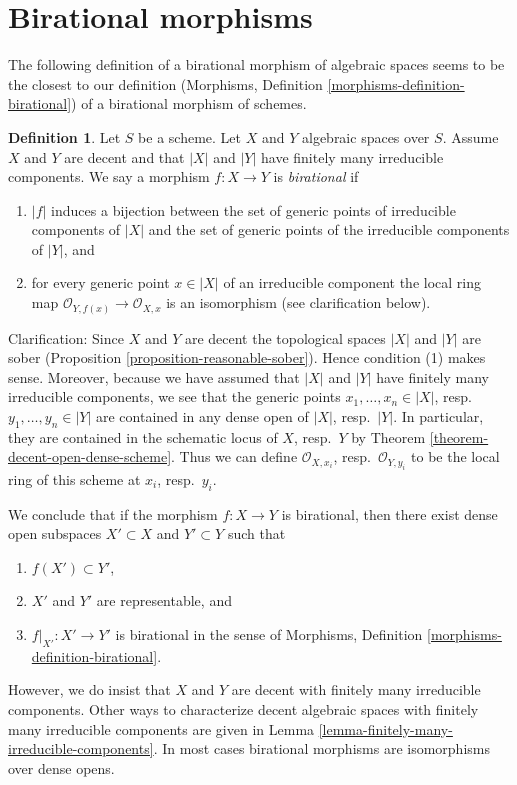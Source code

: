 \documentclass{stacks-project}
\theoremstyle{plain}
\theoremstyle{definition}
\newtheorem{definition}[subsection]{Definition}
\theoremstyle{remark}
\numberwithin{equation}{subsection}
\begin{document}
\section{Birational morphisms}
\label{section-birational}

\noindent
The following definition of a birational morphism of algebraic spaces
seems to be the closest to our definition
(Morphisms, Definition \ref{morphisms-definition-birational})
of a birational morphism of schemes.

\begin{definition}
\label{definition-birational}
Let $S$ be a scheme. Let $X$ and $Y$ algebraic spaces over $S$.
Assume $X$ and $Y$ are decent and that $|X|$ and $|Y|$ have finitely many
irreducible components. We say a morphism $f : X \to Y$ is
{\it birational} if
\begin{enumerate}
\item $|f|$ induces a bijection between the set of generic points
of irreducible components of $|X|$ and the set of generic points
of the irreducible components of $|Y|$, and
\item for every generic point $x \in |X|$ of an irreducible component
the local ring map $\mathcal{O}_{Y, f(x)} \to \mathcal{O}_{X, x}$
is an isomorphism (see clarification below).
\end{enumerate}
\end{definition}

\noindent
Clarification: Since $X$ and $Y$ are decent the topological spaces
$|X|$ and $|Y|$ are sober (Proposition \ref{proposition-reasonable-sober}).
Hence condition (1) makes sense. Moreover, because we have assumed
that $|X|$ and $|Y|$ have finitely many irreducible components, we
see that the generic points $x_1, \ldots, x_n \in |X|$,
resp.\ $y_1, \ldots, y_n \in |Y|$ are contained in any dense open
of $|X|$, resp.\ $|Y|$. In particular, they are contained in
the schematic locus of $X$, resp.\ $Y$ by
Theorem \ref{theorem-decent-open-dense-scheme}.
Thus we can define $\mathcal{O}_{X, x_i}$, resp.\ $\mathcal{O}_{Y, y_i}$
to be the local ring of this scheme at $x_i$, resp.\ $y_i$.

\medskip\noindent
We conclude that if the morphism $f : X \to Y$ is birational, then
there exist dense open subspaces $X' \subset X$ and $Y' \subset Y$ such that
\begin{enumerate}
\item $f(X') \subset Y'$,
\item $X'$ and $Y'$ are representable, and
\item $f|_{X'} : X' \to Y'$ is birational in
the sense of Morphisms, Definition \ref{morphisms-definition-birational}.
\end{enumerate}
However, we do insist that $X$ and $Y$ are decent with finitely many
irreducible components. Other ways to characterize decent algebraic spaces
with finitely many irreducible components
are given in Lemma \ref{lemma-finitely-many-irreducible-components}.
In most cases birational morphisms are isomorphisms over dense opens.
\end{document}
